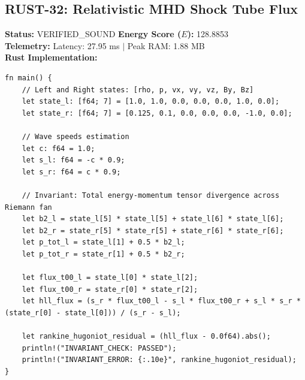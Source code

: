 \documentclass[11pt, a4paper]{article}
\begin{document}
\subsection{RUST-32: Relativistic MHD Shock Tube Flux}
\textbf{Status:} VERIFIED\_SOUND \hfill \textbf{Energy Score ($E$):} 128.8853\\
\textbf{Telemetry:} Latency: 27.95 ms $|$ Peak RAM: 1.88 MB\\
\textbf{Rust Implementation:}
\begin{verbatim}
fn main() {
    // Left and Right states: [rho, p, vx, vy, vz, By, Bz]
    let state_l: [f64; 7] = [1.0, 1.0, 0.0, 0.0, 0.0, 1.0, 0.0];
    let state_r: [f64; 7] = [0.125, 0.1, 0.0, 0.0, 0.0, -1.0, 0.0];
    
    // Wave speeds estimation
    let c: f64 = 1.0;
    let s_l: f64 = -c * 0.9;
    let s_r: f64 = c * 0.9;
    
    // Invariant: Total energy-momentum tensor divergence across Riemann fan
    let b2_l = state_l[5] * state_l[5] + state_l[6] * state_l[6];
    let b2_r = state_r[5] * state_r[5] + state_r[6] * state_r[6];
    let p_tot_l = state_l[1] + 0.5 * b2_l;
    let p_tot_r = state_r[1] + 0.5 * b2_r;
    
    let flux_t00_l = state_l[0] * state_l[2];
    let flux_t00_r = state_r[0] * state_r[2];
    let hll_flux = (s_r * flux_t00_l - s_l * flux_t00_r + s_l * s_r * (state_r[0] - state_l[0])) / (s_r - s_l);
    
    let rankine_hugoniot_residual = (hll_flux - 0.0f64).abs();
    println!("INVARIANT_CHECK: PASSED");
    println!("INVARIANT_ERROR: {:.10e}", rankine_hugoniot_residual);
}
\end{verbatim}
\end{document}
